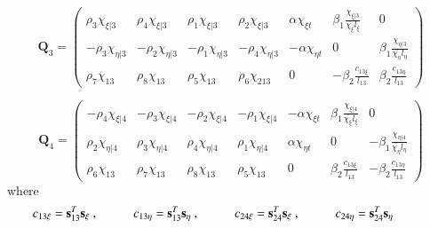 \begin{equation} 
\mathbf{Q}_3 =
\begin{pmatrix}
\rho_3 \chi_{\xi | 3} & \rho_4 \chi_{\xi | 3} & \rho_1 \chi_{\xi | 3} & \rho_2 \chi_{\xi | 3} & \alpha \chi_{\xi t} & \beta_1 \frac{\chi_{\xi | 3}}{\bar{\chi_\xi} l_\xi} & 0  \\	
-\rho_3 \chi_{\eta | 3} & -\rho_2 \chi_{\eta | 3} & -\rho_1 \chi_{\eta | 3} & -\rho_4 \chi_{\eta | 3} & -\alpha \chi_{\eta t} & 0 & \beta_1 \frac{\chi_{\eta | 3}}{\bar{\chi_\eta} l_\eta} \\
\rho_7 \chi_{13} & \rho_8 \chi_{13} & \rho_5 \chi_{13} & \rho_6 \chi_{213} & 0 & -\beta_2 \frac{c_{13 \xi}}{l_{13}} & \beta_2 \frac{c_{13 \eta}}{l_{13}}
\end{pmatrix}		
\label{equation14_3}
\end{equation}

\begin{equation} 
\mathbf{Q}_4 =
\begin{pmatrix}
-\rho_4 \chi_{\xi | 4} & -\rho_3 \chi_{\xi | 4} & -\rho_2 \chi_{\xi | 4} & -\rho_1 \chi_{\xi | 4} & -\alpha \chi_{\xi t} & \beta_1 \frac{\chi_{\xi | 4}}{\bar{\chi_\xi} l_\xi} & 0  \\	
\rho_2 \chi_{\eta | 4} & \rho_3 \chi_{\eta | 4} & \rho_4 \chi_{\eta | 4} & \rho_1 \chi_{\eta | 4} & \alpha \chi_{\eta t} & 0 & -\beta_1 \frac{\chi_{\eta | 4}}{\bar{\chi_\eta} l_\eta} \\
\rho_6 \chi_{13} & \rho_7 \chi_{13} & \rho_8 \chi_{13} & \rho_5 \chi_{13} & 0 & \beta_2 \frac{c_{13 \xi}}{l_{13}} & -\beta_2 \frac{c_{13 \eta}}{l_{13}}
\end{pmatrix}		
\label{equation15}
\end{equation}
where
\begin{align*} 
	c_{13 \xi} = \mathbf{s}_{13}^T \mathbf{s_\xi}\ ,
	\hspace{10mm}
	c_{13 \eta} = \mathbf{s}_{13}^T \mathbf{s_\eta}\ ,
	\hspace{10mm}
	c_{24 \xi} = \mathbf{s}_{24}^T \mathbf{s_\xi}\ ,
	\hspace{10mm}
	c_{24 \eta} = \mathbf{s}_{24}^T \mathbf{s_\eta}
	\hspace{10mm}
\end{align*}

